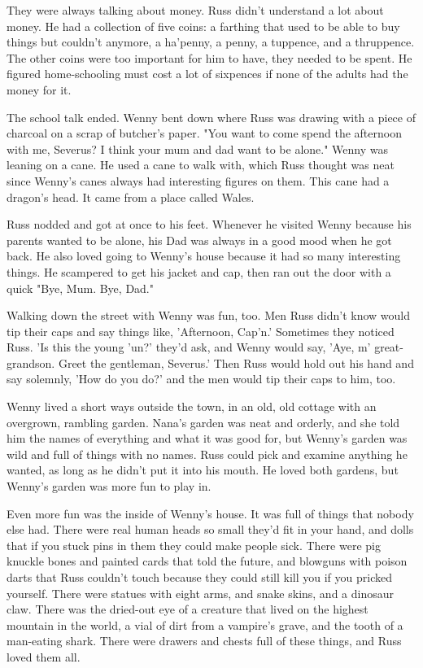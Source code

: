 \documentclass[a4paper,11pt]{article}
\begin{document}
They were always talking about money. Russ didn't understand a lot about money. He had a collection of five coins: a farthing that used to be able to buy things but couldn't anymore, a ha'penny, a penny, a tuppence, and a thruppence. The other coins were too important for him to have, they needed to be spent. He figured home-schooling must cost a lot of sixpences if none of the adults had the money for it.

The school talk ended. Wenny bent down where Russ was drawing with a piece of charcoal on a scrap of butcher's paper. "You want to come spend the afternoon with me, Severus? I think your mum and dad want to be alone." Wenny was leaning on a cane. He used a cane to walk with, which Russ thought was neat since Wenny's canes always had interesting figures on them. This cane had a dragon's head. It came from a place called Wales.

Russ nodded and got at once to his feet. Whenever he visited Wenny because his parents wanted to be alone, his Dad was always in a good mood when he got back. He also loved going to Wenny's house because it had so many interesting things. He scampered to get his jacket and cap, then ran out the door with a quick "Bye, Mum. Bye, Dad."

Walking down the street with Wenny was fun, too. Men Russ didn't know would tip their caps and say things like, 'Afternoon, Cap'n.' Sometimes they noticed Russ. 'Is this the young 'un?' they'd ask, and Wenny would say, 'Aye, m' great-grandson. Greet the gentleman, Severus.' Then Russ would hold out his hand and say solemnly, 'How do you do?' and the men would tip their caps to him, too.

Wenny lived a short ways outside the town, in an old, old cottage with an overgrown, rambling garden. Nana's garden was neat and orderly, and she told him the names of everything and what it was good for, but Wenny's garden was wild and full of things with no names. Russ could pick and examine anything he wanted, as long as he didn't put it into his mouth. He loved both gardens, but Wenny's garden was more fun to play in.

Even more fun was the inside of Wenny's house. It was full of things that nobody else had. There were real human heads so small they'd fit in your hand, and dolls that if you stuck pins in them they could make people sick. There were pig knuckle bones and painted cards that told the future, and blowguns with poison darts that Russ couldn't touch because they could still kill you if you pricked yourself. There were statues with eight arms, and snake skins, and a dinosaur claw. There was the dried-out eye of a creature that lived on the highest mountain in the world, a vial of dirt from a vampire's grave, and the tooth of a man-eating shark. There were drawers and chests full of these things, and Russ loved them all.
\end{document}
